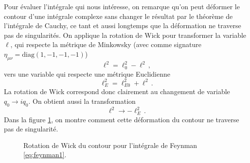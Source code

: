\documentclass{article}
\numberwithin{equation}{section}
\theoremstyle{solution}
\begin{document}
Pour évaluer l'intégrale qui nous intéresse, on remarque qu'on peut déformer le contour d'une intégrale complexe 
sans changer le résultat par le théorème de l'intégrale de Cauchy, ce tant et 
aussi longtemps que la déformation ne traverse pas de singularités. 
On applique la rotation de Wick pour transformer la variable $\ell$, qui respecte la métrique 
de Minkowsky (avec comme signature $\eta_{\mu\nu} = \mathrm{diag}(1, -1, -1, -1)$)
\begin{equation}
        \ell^{2} = \ell_0^{2} - \boldsymbol{\ell}^{2}\, ,
\end{equation}
vers une variable qui respecte une métrique Euclidienne
\begin{equation}
        \ell_{E}^{2} = \ell_{E0}^{2} + \boldsymbol{\ell} ^{2}\, .
\end{equation} 
La rotation de Wick correspond donc clairement au changement de variable $q_0 \rightarrow  i q_0$. 
On obtient aussi la transformation
\begin{equation}
        \ell^{2} \rightarrow  -\ell_E^{2}\, .
\end{equation} 
Dans la figure \ref{fig:wick rot}, on montre comment cette déformation du contour ne traverse pas de singularité.
\begin{figure}[H]
\centering
{}
\caption{Rotation de Wick du contour pour l'intégrale de Feynman \eqref{eq:feynman1}.}
\label{fig:wick rot}
\end{figure}
\end{document}
